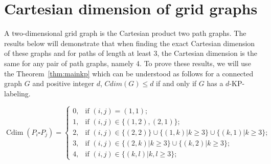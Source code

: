 \documentclass[12pt,a4paper,titlepage,openany]{report}
\DeclareMathOperator{\Cdim}{Cdim}
\begin{document}
\section{Cartesian dimension of grid graphs}
A two-dimensional grid graph is the Cartesian product two path graphs. The results below will demonstrate that when finding the exact Cartesian dimension of these graphs and for paths of length at least 3, the Cartesian dimension is the same for any pair of path graphs, namely 4. To prove these results, we will use the Theorem~\ref{thm:mainkp} which can be understood as follows for a connected graph $G$ and positive integer $d$, $Cdim(G) \leq d$ if and only if $G$ has a $d$-KP-labeling.\newline
\begin{theorem}
\[
	\Cdim(P_i \square P_j ) =
		\left\{
			\begin{array}{ll}
				0, & \text{if $(i,j)=(1,1)$;} \\
				1, & \text{if $(i,j)\in \{(1,2),(2,1)\}$;} \\
				2, & \text{if $(i,j)\in \{(2,2)\} \cup \{(1,k)|k\geq 3\} \cup \{(k,1)|k\geq 3\}$;} \\
				3, & \text{if $(i,j)\in \{(2,k)|k\geq 3\} \cup \{(k,2)|k\geq 3\}$;} \\
				4, & \text{if $(i,j)\in \{(k,l)|k,l\geq 3\}$;}
			\end{array}
		\right.
\]
\end{theorem}
\end{document}
